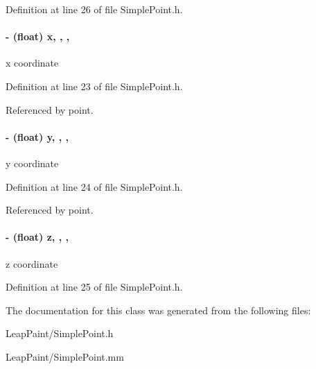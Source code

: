 Definition at line 26 of file Simple\-Point.\-h.

\hypertarget{interface_simple_point_abb16aaf6215e9e946606b30199b1c3af}{
\paragraph[{x}]{\setlength{\rightskip}{0pt plus 5cm}-\/ (float) x\hspace{0.3cm}{\ttfamily [read]}, {\ttfamily [write]}, {\ttfamily [nonatomic]}, {\ttfamily [assign]}}}\label{d9/dc7/interface_simple_point_abb16aaf6215e9e946606b30199b1c3af}
x coordinate 

Definition at line 23 of file Simple\-Point.\-h.



Referenced by point.

\hypertarget{interface_simple_point_ae10ba2c5156e6061258a0720443cd1c8}{
\paragraph[{y}]{\setlength{\rightskip}{0pt plus 5cm}-\/ (float) y\hspace{0.3cm}{\ttfamily [read]}, {\ttfamily [write]}, {\ttfamily [nonatomic]}, {\ttfamily [assign]}}}\label{d9/dc7/interface_simple_point_ae10ba2c5156e6061258a0720443cd1c8}
y coordinate 

Definition at line 24 of file Simple\-Point.\-h.



Referenced by point.

\hypertarget{interface_simple_point_ad74ae8e5d653579e791c040155e7d4d6}{
\paragraph[{z}]{\setlength{\rightskip}{0pt plus 5cm}-\/ (float) z\hspace{0.3cm}{\ttfamily [read]}, {\ttfamily [write]}, {\ttfamily [nonatomic]}, {\ttfamily [assign]}}}\label{d9/dc7/interface_simple_point_ad74ae8e5d653579e791c040155e7d4d6}
z coordinate 

Definition at line 25 of file Simple\-Point.\-h.



The documentation for this class was generated from the following files\-:\begin{DoxyCompactItemize}
\item 
Leap\-Paint/Simple\-Point.\-h\item 
Leap\-Paint/Simple\-Point.\-mm\end{DoxyCompactItemize}
